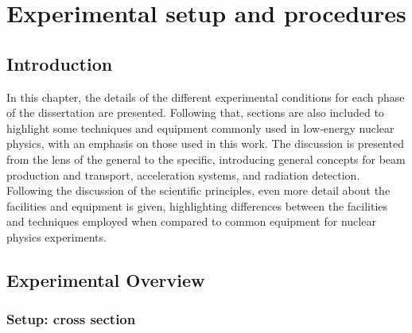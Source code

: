 %
%
%
%
%
%
%
%
%
%

%
%

\chapter{Experimental setup and procedures}
\label{chap: experiment}

\section{Introduction}

In this chapter, the details of the different experimental conditions for each phase of the dissertation are presented. Following that, sections are also included to highlight some techniques and equipment commonly used in low-energy nuclear physics, with an emphasis on those used in this work. The discussion is presented from the lens of the general to the specific, introducing general concepts for beam production and transport, acceleration systems, and radiation detection. Following the discussion of the scientific principles, even more detail about the facilities and equipment is given, highlighting differences between the facilities and techniques employed when compared to common equipment for nuclear physics experiments.



\section{Experimental Overview}
\label{sec: expOverview}


\subsection{Setup: cross section}
\label{sec: csMeasurement}

